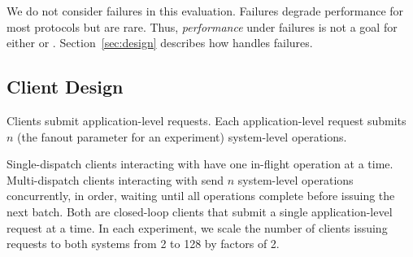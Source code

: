 We do not consider failures in this evaluation. Failures degrade performance for
most protocols but are rare. Thus, \emph{performance} under failures is not a goal
for either \mpaxos{} or \system{}. Section~\ref{sec:design} describes how \system{}
handles failures.



\subsection{Client Design}
Clients submit application-level requests. Each application-level request
submits $n$ (the fanout parameter for an experiment) system-level operations.

Single-dispatch clients interacting with \mpaxos{} have one in-flight operation at
a time. Multi-dispatch clients interacting with \system{} send $n$ system-level
operations concurrently, in order, waiting until all operations complete before
issuing the next batch. Both are closed-loop clients that submit a single
application-level request at a time.
In each experiment, we scale the number of clients issuing requests to both
systems from 2 to 128 by factors of 2.




%


